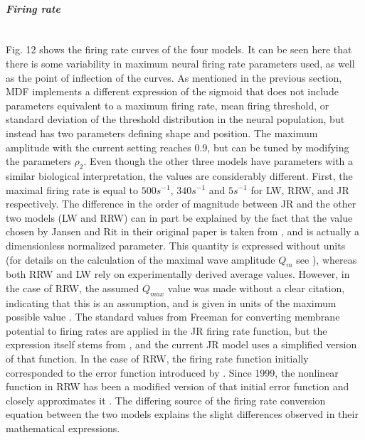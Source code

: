 \documentclass[12pt,twoside]{article}
\begin{document}
\paragraph{\textit{Firing rate}} ~\\
Fig. 12 shows the firing rate curves of the four models. It can be seen here that there is some variability in maximum neural firing rate parameters used, as well as the point of inflection of the curves. As mentioned in the previous section, MDF implements a different expression of the sigmoid that does not include parameters equivalent to a maximum firing rate, mean firing threshold, or standard deviation of the threshold distribution in the neural population, but instead has two parameters defining shape and position. The maximum amplitude with the current setting reaches 0.9, but can be tuned by modifying the parameters $\rho_2$. Even though the other three models have parameters with a similar biological interpretation, the values are considerably different. First, the maximal firing rate is equal to $500s^{-1}$, $340s^{-1}$ and $5s^{-1}$ for LW, RRW, and JR respectively. The difference in the order of magnitude between JR and the other two models (LW and RRW) can in part be explained by the fact that the value chosen by Jansen and Rit in their original paper is taken from \citet{freeman1987simulation}, and is actually a dimensionless normalized parameter. This quantity is expressed without units (for details on the calculation of the maximal wave amplitude $Q_{m}$ see \citealp{freeman1979nonlinear}), whereas both RRW and LW rely on experimentally derived average values. However, in the case of RRW, the assumed $Q_{max}$ value was made without a clear citation, indicating that this is an assumption, and is given in units of the maximum possible value \citep{robinson1997propagation, rennie1999effects}. The standard values from Freeman for converting membrane potential to firing rates are applied in the JR firing rate function, but the expression itself stems from \citet{da1976models}, and the current JR model uses a simplified version of that function. In the case of RRW, the firing rate function initially corresponded to the error function introduced by \citet{wright1995simulation}. Since 1999, the nonlinear function in RRW has been a modified version of that initial error function and closely approximates it \citep{rennie1999effects}. The differing source of the firing rate conversion equation between the two models explains the slight differences observed in their mathematical expressions. 
\end{document}

